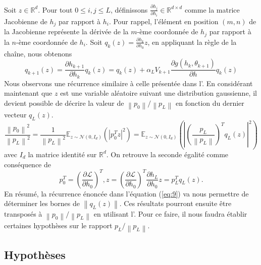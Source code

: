 Soit $z \in \mathbb{R}^d$. Pour tout $0 \leqslant i, j \leqslant L$, définissons $\frac{\partial h_j}{\partial h_i} \in \mathbb{R}^{d \times d}$ comme la matrice Jacobienne de $h_j$ par rapport à $h_i$. Pour rappel, l'élément en position $(m, n)$ de la Jacobienne représente la dérivée de la $m$-ème coordonnée de $h_j$ par rapport à la $n$-ème coordonnée de $h_i$. Soit $q_k(z) = \frac{\partial h_k}{\partial h_0} z$, en appliquant la règle de la chaîne, nous obtenons
\begin{equation}\label{eq:9}
    q_{k+1}(z) = \frac{\partial h_{k+1}}{\partial h_k} q_k(z) = q_k(z) + \alpha _L V_{k+1} \frac{\partial g(h_k, \theta _{k+1})}{\partial h} q_k(z)
\end{equation}
Nous observons une récurrence similaire à celle présentée dans l'. En considérant maintenant que $z$ est une variable aléatoire suivant une distribution gaussienne, il devient possible de décrire la valeur de $\left\| p_0 \right\| / \left\| p_L \right\|$ en fonction du dernier vecteur $q_L(z)$.
\begin{equation}\label{eq:10}
    \frac{\left\| p_0 \right\| ^2}{\left\| p_L \right\| ^2} = \frac{1}{\left\| p_L \right\| ^2} \mathbb{E}_{z \sim \mathcal{N}(0, I_d)}\left(\left| p_0^T z  \right| ^2 \right) = \mathbb{E}_{z \sim \mathcal{N}(0, I_d)}\left(\left| \left(\frac{p_L}{\left\| p_L \right\| } \right)^T q_L(z) \right| ^2 \right)
\end{equation}
avec $ I_d $ la matrice identité sur $ \mathbb{R}^d $. On retrouve la seconde égalité comme conséquence de 
\[
    p_0^T = \left(\frac{\partial \mathscr{L}}{\partial h_0} \right)^T, z = \left(\frac{\partial \mathscr{L}}{\partial h_0} \right)^T \frac{\partial h_L}{\partial h_0} z = p_L^T  q_L(z)
.\]
En résumé, la récurrence énoncée dans l'équation (\ref{eq:9}) va nous permettre de déterminer les bornes de $\left\| q_L(z) \right\|$. Ces résultats pourront ensuite être transposés à $\left\| p_0 \right\| / \left\| p_L \right\|$ en utilisant l'. Pour ce faire, il nous faudra établir certaines hypothèses sur le rapport $p_L / \left\| p_L \right\|$.

\subsection*{Hypothèses}

